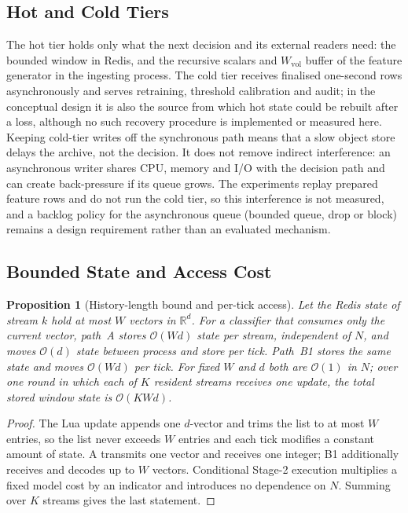 \documentclass[a4paper,fleqn]{cas-dc}
\newtheorem{proposition}{Proposition}
\begin{document}
\subsection{Hot and Cold Tiers}
\label{subsec:tiers}
The hot tier holds only what the next decision and its external readers need: the bounded window in Redis, and the recursive scalars and $W_{\mathrm{vol}}$ buffer of the feature generator in the ingesting process. The cold tier receives finalised one-second rows asynchronously and serves retraining, threshold calibration and audit; in the conceptual design it is also the source from which hot state could be rebuilt after a loss, although no such recovery procedure is implemented or measured here. Keeping cold-tier writes off the synchronous path means that a slow object store delays the archive, not the decision. It does not remove indirect interference: an asynchronous writer shares CPU, memory and I/O with the decision path and can create back-pressure if its queue grows. The experiments replay prepared feature rows and do not run the cold tier, so this interference is not measured, and a backlog policy for the asynchronous queue (bounded queue, drop or block) remains a design requirement rather than an evaluated mechanism.

\subsection{Bounded State and Access Cost}
\label{subsec:complexity}
\begin{proposition}[History-length bound and per-tick access]
\label{prop:bound}
Let the Redis state of stream $k$ hold at most $W$ vectors in $\mathbb{R}^d$. For a classifier that consumes only the current vector, path~A stores $\mathcal{O}(Wd)$ state per stream, independent of $N$, and moves $\mathcal{O}(d)$ state between process and store per tick. Path~B1 stores the same state and moves $\mathcal{O}(Wd)$ per tick. For fixed $W$ and $d$ both are $\mathcal{O}(1)$ in $N$; over one round in which each of $K$ resident streams receives one update, the total stored window state is $\mathcal{O}(KWd)$.
\end{proposition}
\begin{proof}
The Lua update appends one $d$-vector and trims the list to at most $W$ entries, so the list never exceeds $W$ entries and each tick modifies a constant amount of state. A transmits one vector and receives one integer; B1 additionally receives and decodes up to $W$ vectors. Conditional Stage-2 execution multiplies a fixed model cost by an indicator and introduces no dependence on $N$. Summing over $K$ streams gives the last statement.
\end{proof}
\end{document}
